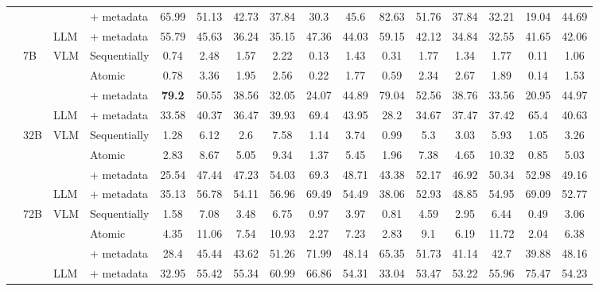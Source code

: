 \begin{table}[h!]
{\begin{tabular}{llllcccccccccccc}
         &  &  & + metadata & 65.99 & 51.13 & 42.73 & 37.84 & 30.3 & 45.6 & 82.63 & 51.76 & 37.84 & 32.21 & 19.04 & 44.69 \\
        \addlinespace
         &  & \multirow{1}{*}{LLM} & + metadata & 55.79 & 45.63 & 36.24 & 35.15 & 47.36 & 44.03 & 59.15 & 42.12 & 34.84 & 32.55 & 41.65 & 42.06 \\
        \cmidrule(lr){3-16}
         & \multirow{4}{*}{7B} & \multirow{3}{*}{VLM} & Sequentially & 0.74 & 2.48 & 1.57 & 2.22 & 0.13 & 1.43 & 0.31 & 1.77 & 1.34 & 1.77 & 0.11 & 1.06 \\
         &  &  & Atomic & 0.78 & 3.36 & 1.95 & 2.56 & 0.22 & 1.77 & 0.59 & 2.34 & 2.67 & 1.89 & 0.14 & 1.53 \\
         &  &  & + metadata & \textbf{79.2} & 50.55 & 38.56 & 32.05 & 24.07 & 44.89 & 79.04 & 52.56 & 38.76 & 33.56 & 20.95 & 44.97 \\
        \addlinespace
         &  & \multirow{1}{*}{LLM} & + metadata & 33.58 & 40.37 & 36.47 & 39.93 & 69.4 & 43.95 & 28.2 & 34.67 & 37.47 & 37.42 & 65.4 & 40.63 \\
        \cmidrule(lr){3-16}
         & \multirow{4}{*}{32B} & \multirow{3}{*}{VLM} & Sequentially & 1.28 & 6.12 & 2.6 & 7.58 & 1.14 & 3.74 & 0.99 & 5.3 & 3.03 & 5.93 & 1.05 & 3.26 \\
         &  &  & Atomic & 2.83 & 8.67 & 5.05 & 9.34 & 1.37 & 5.45 & 1.96 & 7.38 & 4.65 & 10.32 & 0.85 & 5.03 \\
         &  &  & + metadata & 25.54 & 47.44 & 47.23 & 54.03 & 69.3 & 48.71 & 43.38 & 52.17 & 46.92 & 50.34 & 52.98 & 49.16 \\
        \addlinespace
         &  & \multirow{1}{*}{LLM} & + metadata & 35.13 & 56.78 & 54.11 & 56.96 & 69.49 & 54.49 & 38.06 & 52.93 & 48.85 & 54.95 & 69.09 & 52.77 \\
        \cmidrule(lr){3-16}
         & \multirow{4}{*}{72B} & \multirow{3}{*}{VLM} & Sequentially & 1.58 & 7.08 & 3.48 & 6.75 & 0.97 & 3.97 & 0.81 & 4.59 & 2.95 & 6.44 & 0.49 & 3.06 \\
         &  &  & Atomic & 4.35 & 11.06 & 7.54 & 10.93 & 2.27 & 7.23 & 2.83 & 9.1 & 6.19 & 11.72 & 2.04 & 6.38 \\
         &  &  & + metadata & 28.4 & 45.44 & 43.62 & 51.26 & 71.99 & 48.14 & 65.35 & 51.73 & 41.14 & 42.7 & 39.88 & 48.16 \\
        \addlinespace
         &  & \multirow{1}{*}{LLM} & + metadata & 32.95 & 55.42 & 55.34 & 60.99 & 66.86 & 54.31 & 33.04 & 53.47 & 53.22 & 55.96 & 75.47 & 54.23 \\

\end{tabular}}
\end{table}
